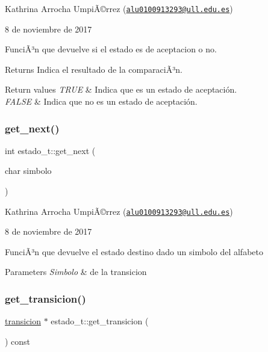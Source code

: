 Kathrina Arrocha UmpiÃ©rrez (\href{mailto:alu0100913293@ull.edu.es}{\tt alu0100913293@ull.\+edu.\+es})

8 de noviembre de 2017

FunciÃ³n que devuelve si el estado es de aceptacion o no. \begin{DoxyReturn}{Returns}
Indica el resultado de la comparaciÃ³n. 
\end{DoxyReturn}

\begin{DoxyRetVals}{Return values}
{\em T\+R\+UE} & Indica que es un estado de aceptación. \\
\hline
{\em F\+A\+L\+SE} & Indica que no es un estado de aceptación. \\
\hline
\end{DoxyRetVals}
\mbox{\label{classestado__t_a0599ddc0084caf5b9c454dcbc2098cb9}} 
\subsubsection{\texorpdfstring{get\+\_\+next()}{get\_next()}}
{\footnotesize\ttfamily int estado\+\_\+t\+::get\+\_\+next (\begin{DoxyParamCaption}\item[{char}]{simbolo }\end{DoxyParamCaption})}

Kathrina Arrocha UmpiÃ©rrez (\href{mailto:alu0100913293@ull.edu.es}{\tt alu0100913293@ull.\+edu.\+es})

8 de noviembre de 2017

FunciÃ³n que devuelve el estado destino dado un simbolo del alfabeto


\begin{DoxyParams}{Parameters}
{\em Simbolo} & de la transicion \\
\hline
\end{DoxyParams}
\mbox{\label{classestado__t_aff818e6eb56c6d862d0e5fc7ca35d1c7}} 
\subsubsection{\texorpdfstring{get\+\_\+transicion()}{get\_transicion()}}
{\footnotesize\ttfamily \hyperlink{structtransicion}{transicion} $\ast$ estado\+\_\+t\+::get\+\_\+transicion (\begin{DoxyParamCaption}{ }\end{DoxyParamCaption}) const}

